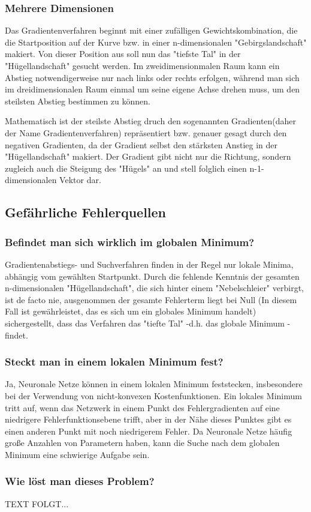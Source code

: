 \subsubsection{Mehrere Dimensionen}\label{subsec:gradientenverfahren:mehrere_dimensionen}
  Das Gradientenverfahren beginnt mit einer zufälligen Gewichtskombination, die die Startposition auf der Kurve bzw. in einer n-dimensionalen "Gebirgslandschaft" makiert.
  Von dieser Position aus soll nun das "tiefste Tal" in der "Hügellandschaft" gesucht werden.
  Im zweidimensionmalen Raum kann ein Abstieg notwendigerweise nur nach links oder rechts erfolgen, während man sich im dreidimensionalen Raum einmal um seine eigene Achse drehen muss,
  um den steilsten Abstieg bestimmen zu können.

  Mathematisch ist der steilste Abstieg druch den sogenannten Gradienten(daher der Name Gradientenverfahren) repräsentiert bzw. genauer gesagt durch den negativen Gradienten, da der 
  Gradient selbst den stärksten Anstieg in der "Hügellandschaft" makiert. Der Gradient gibt nicht nur die Richtung, sondern zugleich auch die Steigung des "Hügels" an und stell folglich
  einen n-1-dimensionalen Vektor dar.\cite{GR10}



\subsection{Gefährliche Fehlerquellen}\label{subsec:gradientenverfahren:fehlerquellen}
\subsubsection{Befindet man sich wirklich im globalen Minimum?}\label{subsec:gradientenverfahren:fehlerquellen_globalen_minimum}
  Gradientenabstiegs- und Suchverfahren finden in der Regel nur lokale Minima, abhängig vom gewählten Startpunkt. Durch die fehlende Kenntnis der gesamten n-dimensionalen "Hügellandschaft", die sich hinter 
  einem "Nebelschleier" verbirgt, ist de facto nie, ausgenommen der gesamte Fehlerterm liegt bei Null (In diesem Fall ist gewährleistet, das es sich um ein globales Minimum handelt)
  sichergestellt, dass das Verfahren das "tiefte Tal" -d.h. das globale Minimum - findet.


\subsubsection{Steckt man in einem lokalen Minimum fest?}\label{subsec:gradientenverfahren:fehlerquellen_lokalen_minimum}
  Ja, Neuronale Netze können in einem lokalen Minimum feststecken, insbesondere bei der Verwendung von nicht-konvexen Kostenfunktionen. Ein lokales Minimum tritt auf, wenn das Netzwerk in einem Punkt des Fehlergradienten
  auf eine niedrigere Fehlerfunktionsebene trifft, aber in der Nähe dieses Punktes gibt es einen anderen Punkt mit noch niedrigerem Fehler.
  Da Neuronale Netze häufig große Anzahlen von Parametern haben, kann die Suche nach dem globalen Minimum eine schwierige Aufgabe sein.\cite{HS97}

\subsubsection{Wie löst man dieses Problem?}\label{subsec:gradientenverfahren:fehlerquellen_problem_loesen}
  TEXT FOLGT...


